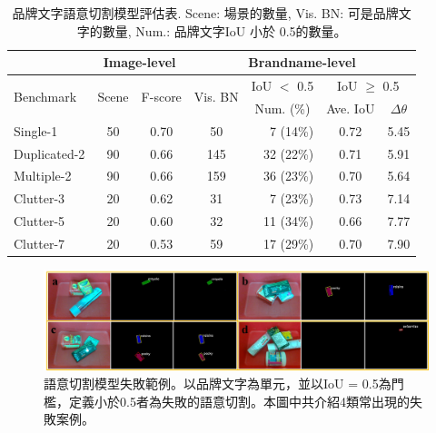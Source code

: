 \begin{table}[tb]
\centering
\caption{品牌文字語意切割模型評估表. Scene: 場景的數量, Vis. BN: 可是品牌文字的數量, Num.: 品牌文字IoU 小於 0.5的數量。}
\label{tbl:segmentation}
\tabcolsep=4pt
\begin{tabular}{l|cc|crcc}
\hline
                               & \multicolumn{2}{c|}{Image-level}                         & \multicolumn{4}{c}{Brandname-level}                                                                                        \\ \hline
\multirow{2}{*}{Benchmark}     & \multirow{2}{*}{Scene}    & \multirow{2}{*}{F-score}     & \multirow{2}{*}{Vis. BN}     & \multicolumn{1}{|c|}{IoU $<$ 0.5} & \multicolumn{2}{c}{IoU $\ge$ 0.5}                                  \\ \cline{5-7}
                               &                           &                              &                         & \multicolumn{1}{|c|}{Num. (\%)}        & \multicolumn{1}{c|}{Ave. IoU} & \multicolumn{1}{c}{$\Delta$$\theta$} \\ \hline
Single-1                       & 50                        & 0.70                & 50                      & 7  (14\%)                         & 0.72                          &  5.45                               \\
Duplicated-2                   & 90                        & 0.66                         & 145                     & 32 (22\%)                         & 0.71                          &  5.91                               \\
Multiple-2                     & 90                        & 0.66                         & 159                     & 36 (23\%)                         & 0.70                          &  5.64                               \\
Clutter-3                      & 20                        & 0.62                         & 31                      & 7  (23\%)                         & 0.73                          &  7.14                               \\
Clutter-5                      & 20                        & 0.60                         & 32                      & 11 (34\%)                         & 0.66                          &  7.77                               \\
Clutter-7                      & 20                        & 0.53                         & 59                      & 17 (29\%)                         & 0.70                          &  7.90                               \\ \hline
\end{tabular}
\end{table}

\begin{figure}[ht]
	\centering
	\includegraphics[height=!, width=0.8\linewidth, keepaspectratio=true]
	{./figures/failure_case.jpg}
  \caption{語意切割模型失敗範例。以品牌文字為單元，並以IoU = 0.5為門檻，定義小於0.5者為失敗的語意切割。本圖中共介紹4類常出現的失敗案例。}
  \label{figure:failure_case}
\end{figure}
